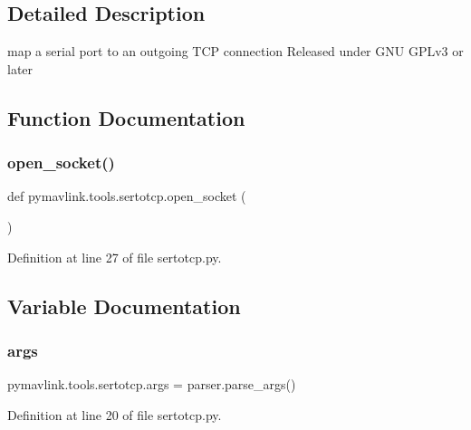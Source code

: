 \subsection{Detailed Description}
\begin{DoxyVerb}map a serial port to an outgoing TCP connection
Released under GNU GPLv3 or later
\end{DoxyVerb}
 

\subsection{Function Documentation}
\mbox{\label{namespacepymavlink_1_1tools_1_1sertotcp_acea7267f0cbd70801a3173f386311131}} 
\subsubsection{\texorpdfstring{open\_socket()}{open\_socket()}}
{\footnotesize\ttfamily def pymavlink.\+tools.\+sertotcp.\+open\+\_\+socket (\begin{DoxyParamCaption}{ }\end{DoxyParamCaption})}



Definition at line 27 of file sertotcp.\+py.



\subsection{Variable Documentation}
\mbox{\label{namespacepymavlink_1_1tools_1_1sertotcp_ab233978b338bba7bac90e2e0ec6e4426}} 
\subsubsection{\texorpdfstring{args}{args}}
{\footnotesize\ttfamily pymavlink.\+tools.\+sertotcp.\+args = parser.\+parse\+\_\+args()}



Definition at line 20 of file sertotcp.\+py.

